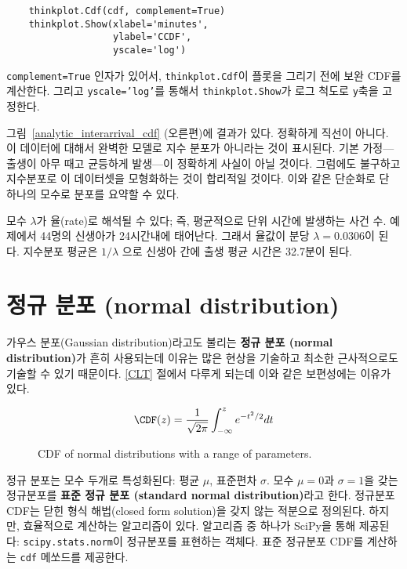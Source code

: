 \begin{verbatim}
    thinkplot.Cdf(cdf, complement=True)
    thinkplot.Show(xlabel='minutes',
                   ylabel='CCDF',
                   yscale='log')
\end{verbatim}

{\tt complement=True} 인자가 있어서, {\tt thinkplot.Cdf}이 플롯을 그리기 전에
보완 CDF를 계산한다. 그리고 {\tt yscale='log'}를 통해서  
{\tt thinkplot.Show}가 로그 척도로 {\tt y}축을 고정한다.

그림~\ref{analytic_interarrival_cdf} (오른편)에 결과가 있다.
정확하게 직선이 아니다. 이 데이터에 대해서 완벽한 모델로 지수 분포가 아니라는 것이 표시된다.
기본 가정---출생이 아무 때고 균등하게 발생---이 정확하게 사실이 아닐 것이다.
그럼에도 불구하고 지수분포로 이 데이터셋을 모형화하는 것이 합리적일 것이다.
이와 같은 단순화로 단 하나의 모수로 분포를 요약할 수 있다.

모수 $\lambda$가 율(rate)로 해석될 수 있다; 즉, 평균적으로 단위 시간에 
발생하는 사건 수. 예제에서 44명의 신생아가 24시간내에 태어난다.
그래서 율값이 분당 $\lambda = 0.0306$이 된다.
지수분포 평균은 $1/\lambda$ 으로 신생아 간에 출생 평균 시간은 32.7분이 된다.

\section{정규 분포 (normal distribution)}
\label{normal}

가우스 분포(Gaussian distribution)라고도 불리는 
{\bf 정규 분포 (normal distribution)}가 흔히 사용되는데 이유는 많은 현상을 기술하고 
최소한 근사적으로도 기술할 수 있기 때문이다.
\ref{CLT} 절에서 다루게 되는데 이와 같은 보편성에는 이유가 있다.

%
\[ \CDF(z) = \frac{1}{\sqrt{2 \pi}} \int_{-\infty}^z e^{-t^2/2} dt \]
%

\begin{figure}
\caption{CDF of normal distributions with a range of parameters.}
\label{analytic_gaussian_cdf}
\end{figure}

정규 분포는 모수 두개로 특성화된다: 평균 $\mu$, 표준편차 $\sigma$.
모수 $\mu=0$과 $\sigma=1$을 갖는 정규분포를 {\bf 표준 정규 분포 (standard normal
 distribution)}라고 한다.
정규분포 CDF는 닫힌 형식 해법(closed form solution)을 갖지 않는 적분으로 정의된다.
하지만, 효율적으로 계산하는 알고리즘이 있다.
알고리즘 중 하나가 SciPy을 통해 제공된다: {\tt scipy.stats.norm}이
정규분포를 표현하는 객체다. 표준 정규분포 CDF를 계산하는 {\tt cdf} 메쏘드를 제공한다.

